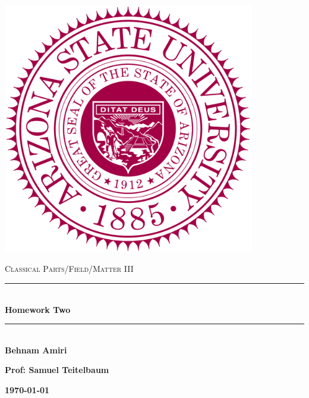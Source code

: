 \documentclass[fleqn]{article}
\begin{document}
  \begin{titlepage}

    \newcommand{\HRule}{\rule{\linewidth}{0.5mm}}

    \center

    \begin{center}
      \includegraphics[height=11cm, width=11cm]{asu.png}
    \end{center}

    \vline

    \textsc{\LARGE Classical Parts/Field/Matter III}\\[1.5cm]

    \HRule \\[0.5cm]
    { \huge \bfseries Homework Two}\\[0.4cm] 
    \HRule \\[1.0cm]

    \textbf{Behnam Amiri}

    \bigbreak

    \textbf{Prof: Samuel Teitelbaum}

    \bigbreak

    \textbf{{\large \today}\\[2cm]}

    \vfill

  \end{titlepage}
\end{document}
